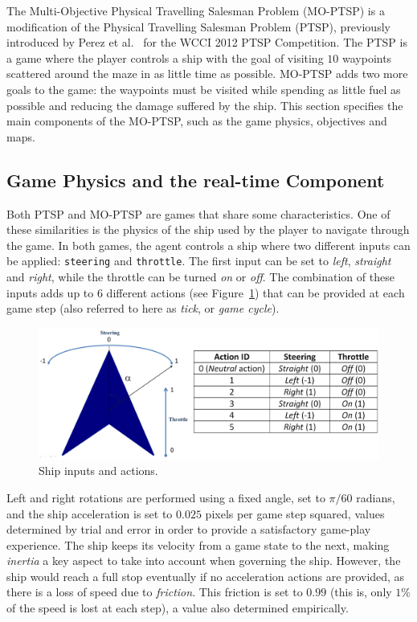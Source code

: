 \documentclass[conference]{IEEEtran}
\begin{document}
The Multi-Objective Physical Travelling Salesman Problem (MO-PTSP) is a modification of the Physical Travelling Salesman Problem (PTSP), previously introduced by Perez et al.~\cite{PerezCEC2012} for the WCCI 2012 PTSP Competition. The PTSP is a game where the player controls a ship with the goal of visiting $10$ waypoints scattered around the maze in as little time as possible. MO-PTSP adds two more goals to the game: the waypoints must be visited while spending as little fuel as possible and reducing the damage suffered by the ship. This section specifies the main components of the MO-PTSP, such as the game physics, objectives and maps. 

\subsection{Game Physics and the real-time Component}

Both PTSP and MO-PTSP are games that share some characteristics. One of these similarities is the physics of the ship used by the player to navigate through the game. In both games, the agent controls a ship where two different inputs can be applied: \texttt{steering} and \texttt{throttle}. The first input can be set to \textit{left}, \textit{straight} and \textit{right}, while the throttle can be turned \textit{on} or \textit{off}. The combination of these inputs adds up to $6$ different actions (see Figure~\ref{fig:ship}) that can be provided at each game step (also referred to here as \textit{tick}, or \textit{game cycle}). 

\begin{figure} [!h]
	\begin{center}
	\includegraphics[width=0.8\columnwidth]{img/ShipActions}
	\caption{Ship inputs and actions.}
	\label{fig:ship}
	\end{center}
\end{figure}

Left and right rotations are performed using a fixed angle, set to $\pi/60$ radians, and the ship acceleration is set to $0.025$ pixels per game step squared, values determined by trial and error in order to provide a satisfactory game-play experience. The ship keeps its velocity from a game state to the next, making \textit{inertia} a key aspect to take into account when governing the ship. However, the ship would reach a full stop eventually if no acceleration actions are provided, as there is a loss of speed due to \textit{friction}. This friction is  set to $0.99$ (this is, only $1\%$ of the speed is lost at each step), a value also determined empirically. 
\end{document}
